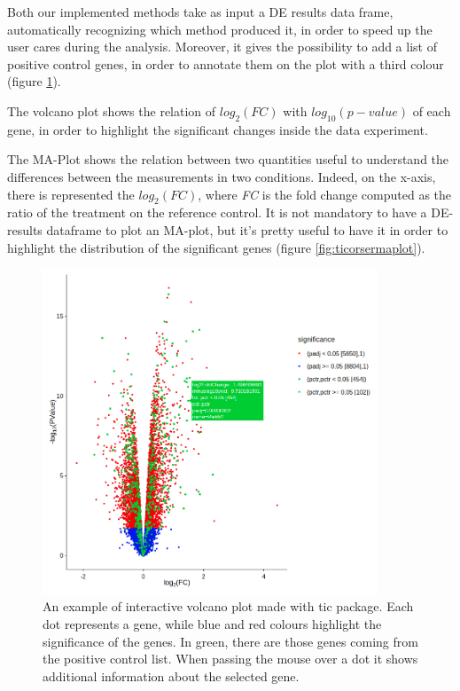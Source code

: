 Both our implemented methods take as input a DE results data frame, automatically recognizing which method produced it, in order to speed up the user cares during the analysis.
Moreover, it gives the possibility to add a list of positive control genes, in order to annotate them on the plot with a third colour (figure \ref{fig:ticorservolcano}).

The volcano plot shows the relation of $log_2(FC)$ with $log_{10}(p-value)$ of each gene, in order to highlight the significant changes inside the data experiment.


The MA-Plot shows the relation between  two quantities useful to understand the differences between the measurements in two conditions.
Indeed, on the x-axis, there is represented the $log_2(FC)$, where \textit{FC} is the fold change computed as the ratio of the treatment on the reference control.
It is not mandatory to have a DE-results dataframe to plot an MA-plot, but it's pretty useful to have it in order to highlight the distribution of the significant genes (figure \ref{fig:ticorsermaplot}).
 
\begin{figure}[H]
\centering
\includegraphics[width=10cm, keepaspectratio]{img/ticorser/volcano_example.png}
\caption[\gls{tic} volcano]{An example of interactive volcano plot made with \gls{tic} package. Each dot represents a gene, while blue and red colours highlight the significance of the genes. In green, there are those genes coming from the positive control list. When passing the mouse over a dot it shows additional information about the selected gene.}
\label{fig:ticorservolcano}
\end{figure}


